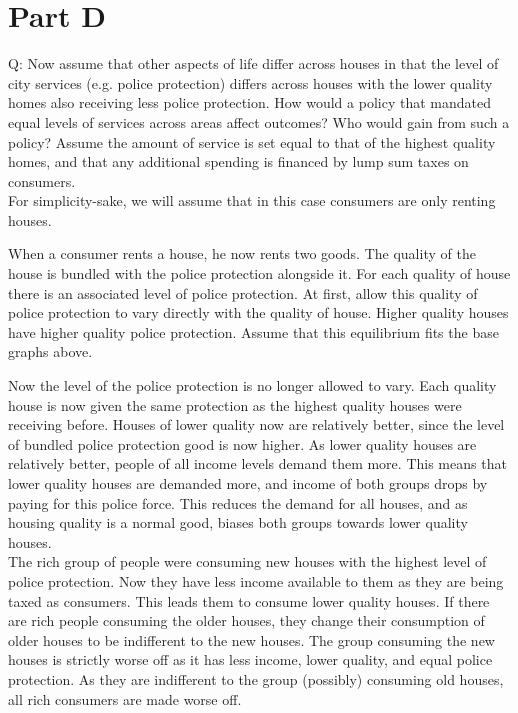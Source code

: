 \documentclass[12pt]{paper}
\begin{document}
\section{Part D}
Q: Now assume that other aspects of life differ across houses in that
the level of city services
(e.g. police protection) differs across
houses with the lower quality homes also receiving
less police
protection. How would a policy that mandated equal levels of services
across
areas affect outcomes? Who would gain from such a policy?
Assume the amount of
service is set equal to that of the highest
quality homes, and that any additional spending
is financed by lump
sum taxes on consumers.
\\

For simplicity-sake, we will assume that in this case consumers are
only renting houses.

When a consumer rents a house, he now rents two goods. The quality of
the house is bundled with the police protection alongside it. For each
quality of house there is an associated level of police protection. At
first, allow this quality of police protection to vary directly with
the quality of house. Higher quality houses have higher quality police
protection. Assume that this equilibrium fits the base graphs above.

Now the level of the police protection is no longer allowed to
vary. Each quality house is now given the same protection as the
highest quality houses were receiving before. Houses of lower quality
now are relatively better, since the level of bundled police
protection good is now higher. As lower quality houses are
relatively better, people of all income levels demand them more. This
means that lower quality houses are demanded more, and income of both
groups drops by paying for this police force. This reduces the demand
for all houses, and as housing quality is a normal good, biases both
groups towards lower quality houses.
\\


The rich group of people were consuming new houses with the
highest level of police protection. Now they have less income
available to them as they are being taxed as consumers. This leads
them to consume lower quality houses. If there are rich people
consuming the older houses, they change their consumption of older
houses to be indifferent to the new houses. The group consuming the
new houses is strictly worse off as it has less income, lower quality,
and equal police protection. As they are indifferent to the group
(possibly) consuming old houses, all rich consumers are made worse off.
\\
\end{document}
